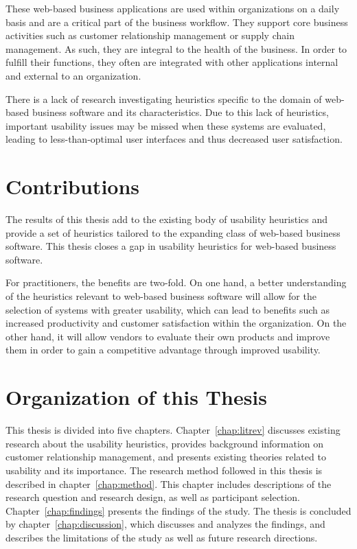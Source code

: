 These web-based business applications are used within organizations on a daily basis and are a critical part of the business workflow. They support core business activities such as customer relationship management or supply chain management. As such, they are integral to the health of the business. In order to fulfill their functions, they often are integrated with other applications internal and external to an organization.

There is a lack of research investigating heuristics specific to the domain of web-based business software and its characteristics. Due to this lack of heuristics, important usability issues may be missed when these systems are evaluated, leading to less-than-optimal user interfaces and thus decreased user satisfaction.

\section{Contributions}
The results of this thesis add to the existing body of usability heuristics and provide a set of heuristics tailored to the expanding class of web-based business software. This thesis closes a gap in usability heuristics for web-based business software.

For practitioners, the benefits are two-fold. On one hand, a better understanding of the heuristics relevant to web-based business software will allow for the selection of systems with greater usability, which can lead to benefits such as increased productivity and customer satisfaction within the organization. On the other hand, it will allow vendors to evaluate their own products and improve them in order to gain a competitive advantage through improved usability.

\section{Organization of this Thesis}
This thesis is divided into five chapters. Chapter~\ref{chap:litrev} discusses existing research about the usability heuristics, provides background information on customer relationship management, and presents existing theories related to usability and its importance. The research method followed in this thesis is described in chapter~\ref{chap:method}. This chapter includes descriptions of the research question and research design, as well as participant selection. Chapter~\ref{chap:findings} presents the findings of the study. The thesis is concluded by chapter~\ref{chap:discussion}, which discusses and analyzes the findings, and describes the limitations of the study as well as future research directions.